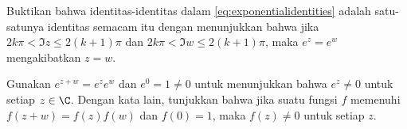 
\begin{exbox}
\begin{exercise} \label{exercise:exponetoonestrip}
Buktikan bahwa identitas-identitas dalam \eqref{eq:exponentialidentities} adalah satu-satunya
identitas semacam itu dengan menunjukkan bahwa jika $2k\pi < \Im z \leq 2(k+1)\pi$ dan
$2k\pi < \Im w \leq 2(k+1)\pi$, maka $e^z=e^w$ mengakibatkan $z=w$.
\end{exercise}

\begin{exercise}%
Gunakan $e^{z+w} = e^z e^w$ dan $e^0 = 1 \neq 0$ untuk menunjukkan bahwa $e^z \neq 0$ untuk setiap
$z \in \C$. Dengan kata lain, tunjukkan bahwa jika suatu fungsi $f$ memenuhi $f(z+w)=f(z)f(w)$
dan $f(0) = 1$, maka $f(z) \neq 0$ untuk setiap $z$.
\end{exercise}
\end{exbox}
